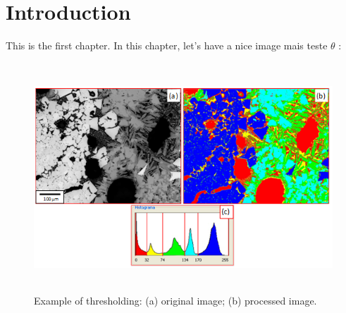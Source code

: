 
\chapter{Introduction}

This is the first chapter. In this chapter, let's have a nice image mais teste $\theta$  :


\begin{figure} [h]
  \begin{center}
    \includegraphics[height=243pt,width=400pt]{images/fig2-6}
    \caption{Example of thresholding: (a) original image; (b) processed
      image.\cite{74}}\label{fig:2-6}
  \end{center}
\end{figure}
